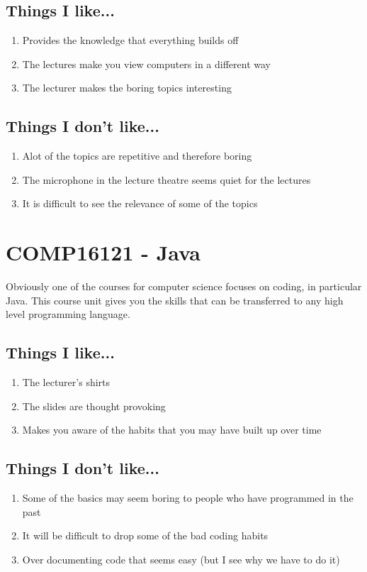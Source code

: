 \documentclass[a4paper]{article}
\begin{document}
\subsection{Things I like...}
\begin{enumerate}
\item Provides the knowledge that everything builds off
\item The lectures make you view computers in a different way
\item The lecturer makes the boring topics interesting
\end{enumerate}
\subsection{Things I don't like...}
\begin{enumerate}
\item Alot of the topics are repetitive and therefore boring
\item The microphone in the lecture theatre seems quiet for the lectures
\item It is difficult to see the relevance of some of the topics
\end{enumerate}

\section{COMP16121 - Java}
Obviously one of the courses for computer science focuses on coding, in particular Java. This course unit gives you the skills that can be 
transferred to any high level programming language.
\subsection{Things I like...}
\begin{enumerate}
\item The lecturer's shirts
\item The slides are thought provoking
\item Makes you aware of the habits that you may have built up over time
\end{enumerate}
\subsection{Things I don't like...}
\begin{enumerate}
\item Some of the basics may seem boring to people who have programmed in the past
\item It will be difficult to drop some of the bad coding habits
\item Over documenting code that seems easy (but I see why we have to do it)
\end{enumerate}
\end{document}

